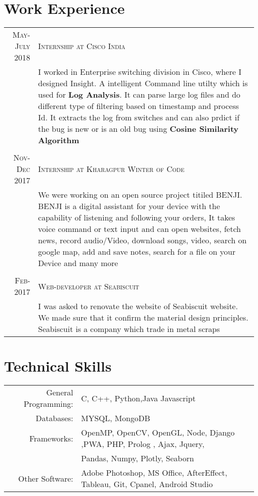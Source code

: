\documentclass[a4paper,10pt]{article}
\begin{document}
\section{Work Experience}
    \begin{tabular}{r|p{12cm}}
        \textsc{May-July 2018}&\textsc{Internship at Cisco India}\\ &\footnotesize{I worked in Enterprise switching division in Cisco, where I designed Insight. A intelligent Command line utilty which is used for \textbf{Log Analysis}}. It can parse large log files and do different type of filtering based on timestamp and process Id. It extracts the log from switches and can also prdict if the bug is new or is an old bug using \textbf{Cosine Similarity Algorithm}\\\\
      
        \textsc{Nov- Dec 2017}&\textsc{Internship at Kharagpur Winter of Code}\\ &\footnotesize{We were working on an open source project titiled BENJI. BENJI is a digital assistant for your device with the capability of listening and following your orders, It takes voice command or text input and can open websites, fetch news, record audio/Video, download songs, video, search on google map, add and save notes, search for a file on your Device and many more}\\\\
        
         
        \textsc{Feb-2017}&\textsc{Web-developer at Seabiscuit}\\ &\footnotesize{I was asked to renovate the website of Seabiscuit website. We made sure that it confirm
        the material design principles. Seabiscuit is a company which trade in metal scraps} \\
    \end{tabular}

\section{Technical Skills}
    \begin{tabular}{rl}
         General Programming:& C, C++, Python,Java Javascript\\
         Databases:&MYSQL, MongoDB \\
         Frameworks:& OpenMP, OpenCV, OpenGL, Node, Django ,PWA, PHP, Prolog , Ajax, Jquery,\\ &Pandas, Numpy, Plotly, Seaborn\\
         Other Software: & Adobe Photoshop, MS Office, AfterEffect, Tableau, Git, Cpanel, Android Studio
    \end{tabular}
\end{document}
